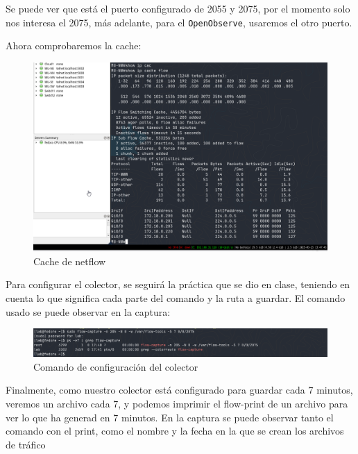 \documentclass[11pt]{article}
\begin{document}
Se puede ver que está el puerto configurado de 2055 y 2075, por el momento solo nos interesa el 2075, más adelante, para el \texttt{OpenObserve}, usaremos el otro puerto.

Ahora comprobaremos la cache:

\begin{figure}[h]
    \centering
    \includegraphics[width=\textwidth]{src/cacheflow.png}
    \caption{Cache de netflow}
\end{figure}


Para configurar el colector, se seguirá la práctica que se dio en clase, teniendo en cuenta lo que significa cada parte del comando y la ruta a guardar. El comando usado se puede observar en la captura:

\begin{figure}[h]
    \centering
    \includegraphics[width=\textwidth]{src/comandoflow.png}
    \caption{Comando de configuración del colector}
\end{figure}

Finalmente, como nuestro colector está configurado para guardar cada 7 minutos, veremos un archivo cada 7, y podemos imprimir el flow-print de un archivo para ver lo que ha generad en 7 minutos. En la captura se puede observar tanto el comando con el print, como el nombre y la fecha en la que se crean los archivos de tráfico
\end{document}
